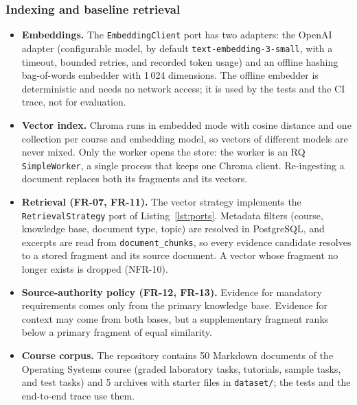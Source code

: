 \documentclass[12pt,a4paper]{article}
\begin{document}
\subsubsection*{Indexing and baseline retrieval}

\begin{itemize}
    \item \textbf{Embeddings.} The \texttt{EmbeddingClient} port has two
    adapters: the OpenAI adapter (configurable model, by default
    \texttt{text-embedding-3-small}, with a timeout, bounded retries,
    and recorded token usage) and an offline hashing bag-of-words
    embedder with 1\,024 dimensions. The offline embedder is
    deterministic and needs no network access; it is used by the tests
    and the CI trace, not for evaluation.

    \item \textbf{Vector index.} Chroma runs in embedded mode with
    cosine distance and one collection per course and embedding model,
    so vectors of different models are never mixed. Only the worker
    opens the store: the worker is an RQ \texttt{SimpleWorker}, a single
    process that keeps one Chroma client. Re-ingesting a document
    replaces both its fragments and its vectors.

    \item \textbf{Retrieval (FR-07, FR-11).} The vector strategy
    implements the \texttt{RetrievalStrategy} port of
    Listing~\ref{lst:ports}. Metadata filters (course, knowledge base,
    document type, topic) are resolved in PostgreSQL, and excerpts are
    read from \texttt{document\_chunks}, so every evidence candidate
    resolves to a stored fragment and its source document. A vector
    whose fragment no longer exists is dropped (NFR-10).

    \item \textbf{Source-authority policy (FR-12, FR-13).} Evidence for
    mandatory requirements comes only from the primary knowledge base.
    Evidence for context may come from both bases, but a supplementary
    fragment ranks below a primary fragment of equal similarity.

    \item \textbf{Course corpus.} The repository contains 50 Markdown
    documents of the Operating Systems course (graded laboratory tasks,
    tutorials, sample tasks, and test tasks) and 5 archives with
    starter files in \texttt{dataset/}; the tests and the end-to-end
    trace use them.
\end{itemize}
\end{document}
